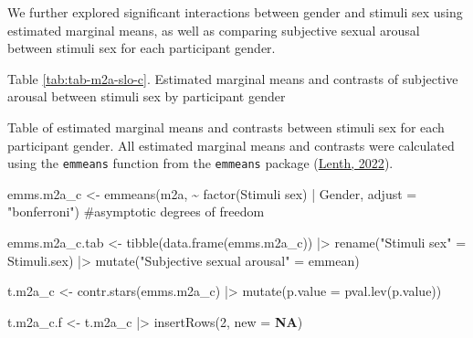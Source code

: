 \documentclass[
  bookmarksnumbered]{article}
\newenvironment{Shaded}{\begin{snugshade}}{\end{snugshade}}
\newcommand{\AttributeTok}[1]{\textcolor[rgb]{0.80,0.80,0.80}{#1}}
\newcommand{\CommentTok}[1]{\textcolor[rgb]{0.50,0.62,0.50}{#1}}
\newcommand{\ConstantTok}[1]{\textcolor[rgb]{0.86,0.64,0.64}{\textbf{#1}}}
\newcommand{\DecValTok}[1]{\textcolor[rgb]{0.86,0.86,0.80}{#1}}
\newcommand{\FunctionTok}[1]{\textcolor[rgb]{0.94,0.94,0.56}{#1}}
\newcommand{\NormalTok}[1]{\textcolor[rgb]{0.80,0.80,0.80}{#1}}
\newcommand{\OtherTok}[1]{\textcolor[rgb]{0.94,0.94,0.56}{#1}}
\newcommand{\SpecialCharTok}[1]{\textcolor[rgb]{0.86,0.64,0.64}{#1}}
\newcommand{\StringTok}[1]{\textcolor[rgb]{0.80,0.58,0.58}{#1}}
\begin{document}
We further explored significant interactions between gender and stimuli sex using estimated marginal means, as well as comparing subjective sexual arousal between stimuli sex for each participant gender.

Table \ref{tab:tab-m2a-slo-c}. Estimated marginal means and contrasts of subjective arousal between stimuli sex by participant gender

Table of estimated marginal means and contrasts between stimuli sex for each participant gender. All estimated marginal means and contrasts were calculated using the \texttt{emmeans} function from the \texttt{emmeans} package (\protect\hyperlink{ref-emmeanscit}{Lenth, 2022}).

\begin{Shaded}
\begin{Highlighting}[]
\NormalTok{emms.m2a\_c }\OtherTok{\textless{}{-}} \FunctionTok{emmeans}\NormalTok{(m2a, }\SpecialCharTok{\textasciitilde{}} \FunctionTok{factor}\NormalTok{(}\StringTok{\textasciigrave{}}\AttributeTok{Stimuli sex}\StringTok{\textasciigrave{}}\NormalTok{) }\SpecialCharTok{|}\NormalTok{ Gender,}
                    \AttributeTok{adjust =} \StringTok{"bonferroni"}\NormalTok{) }\CommentTok{\#asymptotic degrees of freedom}

\NormalTok{emms.m2a\_c.tab }\OtherTok{\textless{}{-}} \FunctionTok{tibble}\NormalTok{(}\FunctionTok{data.frame}\NormalTok{(emms.m2a\_c)) }\SpecialCharTok{|\textgreater{}}
  \FunctionTok{rename}\NormalTok{(}\StringTok{"Stimuli sex"} \OtherTok{=}\NormalTok{ Stimuli.sex) }\SpecialCharTok{|\textgreater{}} 
  \FunctionTok{mutate}\NormalTok{(}\StringTok{"Subjective sexual arousal"} \OtherTok{=}\NormalTok{ emmean)}

\NormalTok{t.m2a\_c }\OtherTok{\textless{}{-}} \FunctionTok{contr.stars}\NormalTok{(emms.m2a\_c) }\SpecialCharTok{|\textgreater{}} 
  \FunctionTok{mutate}\NormalTok{(}\AttributeTok{p.value =} \FunctionTok{pval.lev}\NormalTok{(p.value))}

\NormalTok{t.m2a\_c.f }\OtherTok{\textless{}{-}}\NormalTok{ t.m2a\_c }\SpecialCharTok{|\textgreater{}} 
  \FunctionTok{insertRows}\NormalTok{(}\DecValTok{2}\NormalTok{, }\AttributeTok{new =} \ConstantTok{NA}\NormalTok{)}


\end{Highlighting}
\end{Shaded}
\end{document}
